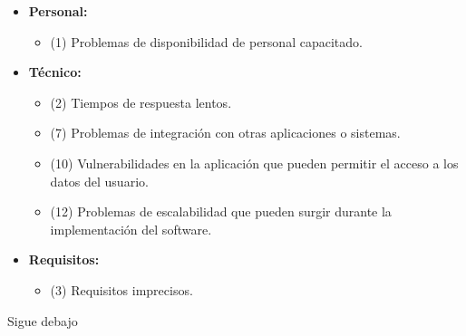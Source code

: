 \begin{solucion}

    \begin{itemize}
        \item \textbf{Personal:}
        \begin{itemize}
            \item (1) Problemas de disponibilidad de personal capacitado.
        \end{itemize}

        \item \textbf{Técnico:}
        \begin{itemize}
            \item (2) Tiempos de respuesta lentos.
            \item (7) Problemas de integración con otras aplicaciones o sistemas.
            \item (10) Vulnerabilidades en la aplicación que pueden permitir el acceso a los datos del usuario.
            \item (12) Problemas de escalabilidad que pueden surgir durante la implementación del software.
        \end{itemize}


        \item \textbf{Requisitos:}
        \begin{itemize}
            \item (3) Requisitos imprecisos.
        \end{itemize}
    \end{itemize}
    Sigue debajo
\end{solucion}
